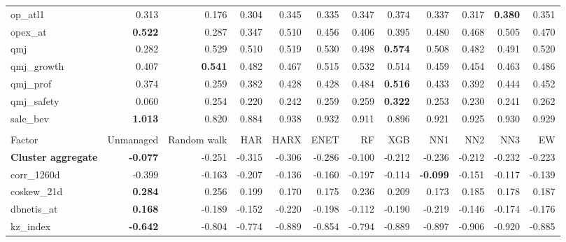 \begin{landscape}
\begin{longtable}{>{\raggedright\arraybackslash}p{2.6cm}rrrrrrrrrrr}
op\_atl1 & 0.313 & 0.176 & 0.304 & \cellcolor{blue!10}0.345 & \cellcolor{blue!10}0.335 & \cellcolor{blue!10}0.347 & \cellcolor{blue!10}0.374 & \cellcolor{blue!10}0.337 & \cellcolor{blue!10}0.317 & \textbf{\cellcolor{blue!10}0.380} & \cellcolor{blue!10}0.351 \\
opex\_at & \textbf{0.522} & 0.287 & 0.347 & 0.510 & 0.456 & 0.406 & 0.395 & 0.480 & 0.468 & 0.505 & 0.470 \\
qmj & 0.282 & 0.529 & 0.510 & 0.519 & \cellcolor{blue!10}0.530 & 0.498 & \textbf{\cellcolor{blue!10}0.574} & 0.508 & 0.482 & 0.491 & 0.520 \\
qmj\_growth & 0.407 & \textbf{0.541} & 0.482 & 0.467 & 0.515 & 0.532 & 0.514 & 0.459 & 0.454 & 0.463 & 0.486 \\
qmj\_prof & 0.374 & 0.259 & \cellcolor{blue!10}0.382 & \cellcolor{blue!10}0.428 & \cellcolor{blue!10}0.428 & \cellcolor{blue!10}0.484 & \textbf{\cellcolor{blue!10}0.516} & \cellcolor{blue!10}0.433 & \cellcolor{blue!10}0.392 & \cellcolor{blue!10}0.444 & \cellcolor{blue!10}0.452 \\
qmj\_safety & 0.060 & 0.254 & 0.220 & 0.242 & \cellcolor{blue!10}0.259 & \cellcolor{blue!10}0.259 & \textbf{\cellcolor{blue!10}0.322} & 0.253 & 0.230 & 0.241 & \cellcolor{blue!10}0.262 \\
sale\_bev & \textbf{1.013} & 0.820 & 0.884 & 0.938 & 0.932 & 0.911 & 0.896 & 0.921 & 0.925 & 0.930 & 0.929 \\
\hline
\multicolumn{12}{@{}l}{\textit{Panel J. Seasonality}} \\
\hline
Factor & Unmanaged & Random walk & HAR & HARX & ENET & RF & XGB & NN1 & NN2 & NN3 & EW \\
\hline
\textbf{Cluster aggregate} & \textbf{-0.077} & -0.251 & -0.315 & -0.306 & -0.286 & -0.100 & -0.212 & -0.236 & -0.212 & -0.232 & -0.223 \\
corr\_1260d & -0.399 & -0.163 & -0.207 & \cellcolor{blue!10}-0.136 & \cellcolor{blue!10}-0.160 & -0.197 & \cellcolor{blue!10}-0.114 & \textbf{\cellcolor{blue!10}-0.099} & \cellcolor{blue!10}-0.151 & \cellcolor{blue!10}-0.117 & \cellcolor{blue!10}-0.139 \\
coskew\_21d & \textbf{0.284} & 0.256 & 0.199 & 0.170 & 0.175 & 0.236 & 0.209 & 0.173 & 0.185 & 0.178 & 0.187 \\
dbnetis\_at & \textbf{0.168} & -0.189 & -0.152 & -0.220 & -0.198 & -0.112 & -0.190 & -0.219 & -0.146 & -0.174 & -0.176 \\
kz\_index & \textbf{-0.642} & -0.804 & -0.774 & -0.889 & -0.854 & -0.794 & -0.889 & -0.897 & -0.906 & -0.920 & -0.885 \\

\end{longtable}
\end{landscape}
